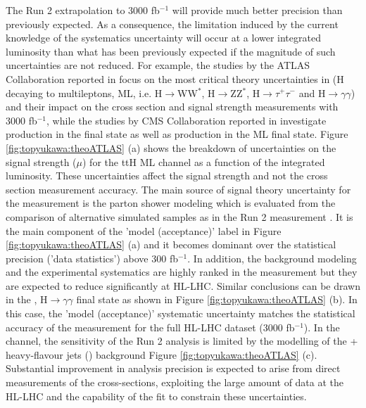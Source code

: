 The Run 2 extrapolation to 3000 fb$^{-1}$ will provide much better precision than previously expected. As a consequence, the limitation induced by the current knowledge of the systematics uncertainty will occur at a lower integrated luminosity than what has been previously expected if the magnitude of such uncertainties are not reduced.
For example, the studies by the ATLAS Collaboration reported in \cite{ATL-PHYS-PUB-2018-010} focus on the most critical theory uncertainties in \ttH (H decaying to multileptons, ML, i.e.  H$\rightarrow$WW$^{*}$, H$\rightarrow$ZZ$^{*}$, H$\rightarrow \tau^{+}\tau^{-}$ and H$\rightarrow \gamma\gamma$) and their impact on the cross section and signal strength measurements with 3000 fb$^{-1}$, while the studies by CMS Collaboration reported in \cite{CMS-PAS-FTR-18-011} investigate \ttH production in the \Hbb final state as well as \tH production in the ML final state.
Figure \ref{fig:topyukawa:theoATLAS} (a) shows the breakdown of uncertainties on the signal strength ($\mu$) for the ttH ML channel as a function of the integrated luminosity. These uncertainties affect the signal strength and not the cross section measurement accuracy. The main source of signal theory uncertainty for the measurement is the parton shower modeling which is evaluated from the comparison of alternative simulated samples as in the Run 2 measurement \cite{Aaboud:2017jvq}. It is the main component of the '\ttH model (acceptance)' label in Figure \ref{fig:topyukawa:theoATLAS} (a) and it becomes dominant over the statistical precision ('data statistics') above 300 fb$^{-1}$. In addition, the background modeling and the experimental systematics are highly ranked in the measurement but they are expected to reduce significantly at HL-LHC. Similar conclusions can be drawn in the \ttH, H$\rightarrow \gamma\gamma$ final state as shown in Figure \ref{fig:topyukawa:theoATLAS} (b). In this case, the '\ttH model (acceptance)' systematic uncertainty matches the statistical accuracy of the measurement for the full HL-LHC dataset (3000 fb$^{-1}$). 
In the \Hbb channel, the sensitivity of the Run 2 analysis is limited by the modelling of the \ttbar + heavy-flavour jets (\ttHF) background Figure \ref{fig:topyukawa:theoATLAS} (c).
Substantial improvement in analysis precision is expected to arise from direct measurements of the \ttHF cross-sections, exploiting the large amount of data at the HL-LHC and the capability of the fit to constrain these uncertainties.
